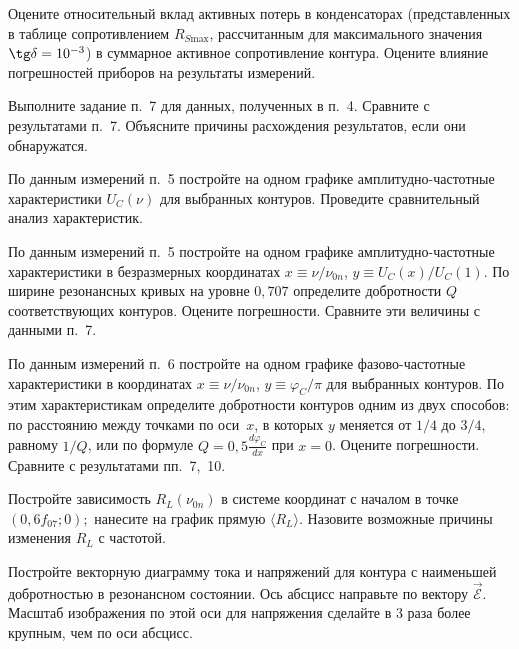 \begin{lab:task}

Оцените относительный вклад активных потерь в конденсаторах
(представленных в таблице сопротивлением $R_{S\text{max}}$, рассчитанным
для максимального значения $\tg\delta=10^{-3}$) в суммарное активное
сопротивление контура. Оцените влияние погрешностей приборов на результаты
измерений.

    \item *Выполните задание п.~7 для данных, полученных в п.~4. 
    Сравните с результатами п.~7. Объясните причины расхождения результатов, 
    если они обнаружатся.

    \item По данным измерений п.~5 постройте на одном графике
амплитудно-частотные характеристики $U_C(\nu)$ для выбранных
контуров. Проведите сравнительный анализ характеристик.

    \item По данным измерений п.~5 постройте на одном графике
амплитудно-частотные характеристики в безразмерных координатах 
$x\equiv \nu/\nu_{0n}$, $y\equiv U_C(x)/U_C(1)$. 
По ширине резонансных кривых на уровне $0,707$ определите добротности $Q$ 
соответствующих контуров. Оцените погрешности. 
Сравните эти величины с данными п.~7.

    \item По данным измерений п.~6 постройте на одном графике
фазово-частотные характеристики в координатах 
$x\equiv \nu/\nu_{0n}$, $y\equiv\varphi_C/\pi$ для выбранных контуров. 
По этим характеристикам определите
добротности контуров одним из двух способов: по расстоянию между точками по оси~$x$, 
в которых $y$ меняется от $1/4$ до $3/4$, равному $1/Q$, или по формуле
$Q=0,5\frac{d\varphi_C}{dx}$ при $x=0$. Оцените погрешности. 
Сравните с результатами пп.~7,~10.

    \item Постройте зависимость $R_L(\nu_{0n})$ в системе координат с началом 
    в точке $(0,6f_{07};0);$ нанесите на график прямую $\langle R_L\rangle$. 
    Назовите возможные причины изменения $R_L$ с частотой.

    \item Постройте векторную диаграмму тока и напряжений для контура 
    с наименьшей добротностью в резонансном состоянии. Ось абсцисс направьте 
    по вектору $\vec{\mathcal{E}}.$ Масштаб изображения по этой оси
    для напряжения сделайте в 3 раза более крупным, чем по оси абсцисс.

\end{lab:task}


